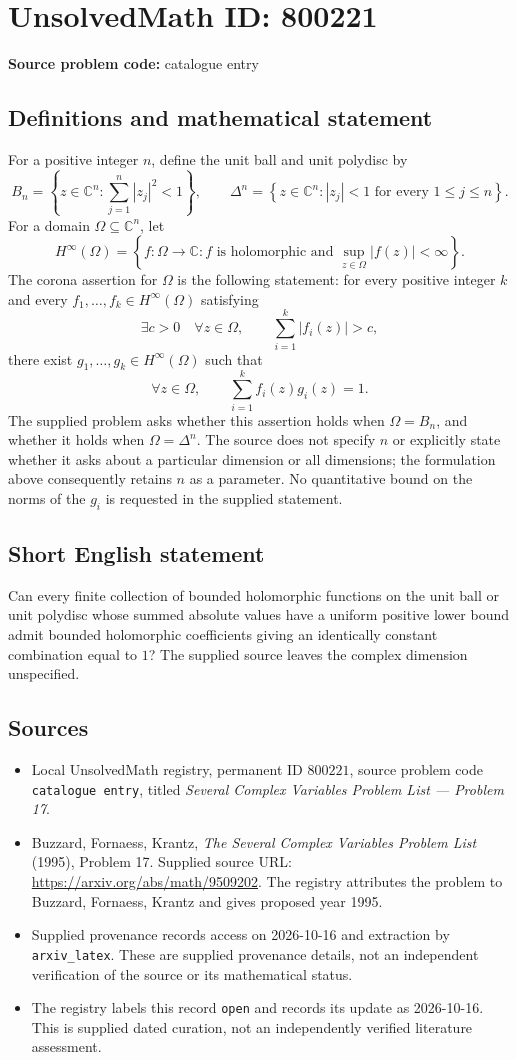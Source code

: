 \documentclass[11pt]{article}
\newcommand{\C}{\mathbb{C}}
\begin{document}
\section*{UnsolvedMath ID: 800221}
\textbf{Source problem code:} catalogue entry
\subsection{Definitions and mathematical statement}
For a positive integer \(n\), define the unit ball and unit polydisc by
\[
B_n=\left\{z\in\C^n:\sum_{j=1}^{n}|z_j|^2<1\right\},\qquad
\Delta^n=\left\{z\in\C^n:|z_j|<1\text{ for every }1\le j\le n\right\}.
\]
For a domain \(\Omega\subseteq\C^n\), let
\[
H^\infty(\Omega)=\left\{f:\Omega\to\C:f\text{ is holomorphic and }\sup_{z\in\Omega}|f(z)|<\infty\right\}.
\]
The corona assertion for \(\Omega\) is the following statement: for every positive integer \(k\) and every \(f_1,\ldots,f_k\in H^\infty(\Omega)\) satisfying
\[
\exists c>0\quad\forall z\in\Omega,\qquad \sum_{i=1}^{k}|f_i(z)|>c,
\]
there exist \(g_1,\ldots,g_k\in H^\infty(\Omega)\) such that
\[
\forall z\in\Omega,\qquad \sum_{i=1}^{k}f_i(z)g_i(z)=1.
\]
The supplied problem asks whether this assertion holds when \(\Omega=B_n\), and whether it holds when \(\Omega=\Delta^n\). The source does not specify \(n\) or explicitly state whether it asks about a particular dimension or all dimensions; the formulation above consequently retains \(n\) as a parameter. No quantitative bound on the norms of the \(g_i\) is requested in the supplied statement.
\subsection{Short English statement}
Can every finite collection of bounded holomorphic functions on the unit ball or unit polydisc whose summed absolute values have a uniform positive lower bound admit bounded holomorphic coefficients giving an identically constant combination equal to \(1\)? The supplied source leaves the complex dimension unspecified.
\subsection{Sources}
\begin{itemize}
\item Local UnsolvedMath registry, permanent ID \(800221\), source problem code \texttt{catalogue entry}, titled \emph{Several Complex Variables Problem List --- Problem 17}.
\item Buzzard, Fornaess, Krantz, \emph{The Several Complex Variables Problem List} (1995), Problem 17. Supplied source URL: \url{https://arxiv.org/abs/math/9509202}. The registry attributes the problem to Buzzard, Fornaess, Krantz and gives proposed year 1995.
\item Supplied provenance records access on 2026-10-16 and extraction by \texttt{arxiv\_latex}. These are supplied provenance details, not an independent verification of the source or its mathematical status.
\item The registry labels this record \texttt{open} and records its update as 2026-10-16. This is supplied dated curation, not an independently verified literature assessment.
\end{itemize}
\end{document}
